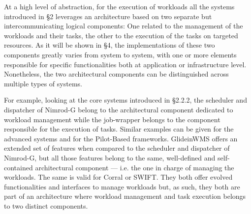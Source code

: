 \documentclass{sig-alternate}
\begin{document}
At a high level of abstraction, for the execution of workloads all the
\pilotjob systems introduced in \S2 leverages an architecture based on two
separate but intercommunicating logical components: One related to the
management of the workloads and their tasks, the other to the execution of the
tasks on targeted resources. As it will be shown in \S4, the implementations
of these two components greatly varies from system to system, with one or more
elements responsible for specific functionalities both at application or
infrastructure level. Nonetheless, the two architectural components can be
distinguished across multiple types of \pilotjob systems.

For example, looking at the core \pilotjob systems introduced in \S2.2.2, the
scheduler and dispatcher of Nimrod-G belong to the architectural component
dedicated to workload management while the job-wrapper belongs to the
component responsible for the execution of tasks. Similar examples can be
given for the advanced \pilotjob systems and for the Pilot-Based frameworks.
GlideinWMS offers an extended set of features when compared to the scheduler
and dispatcher of Nimrod-G, but all those features belong to the same,
well-defined and self-contained architectural component --- i.e. the one in
charge of managing the workloads.  The same is valid for Corral or SWIFT. They
both offer evolved functionalities and interfaces to manage workloads but, as
such, they both are part of an architecture where workload management and task
execution belongs to two distinct components. 

\end{document}
